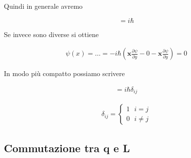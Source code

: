 Quindi in generale avremo

\begin{equation}
[\mathbf{q_i}, \mathbf{p_i}]= i \hbar
\end{equation}

Se invece sono diverse si ottiene

\begin{align}
[\mathbf{x}, \mathbf{p_y}]\psi(x)= \dots =  -i \hbar \left(
\mathbf{x} \frac{\partial \psi}{\partial y} - 0 - \mathbf{x} \frac{\partial \psi}{\partial y}
\right)= 0
\end{align}

In modo più compatto possiamo scrivere

\begin{align}
[\mathbf{q_i}, \mathbf{p_i}]= i \hbar \delta_{ij}
\end{align}

\begin{align}
 \delta_{ij} =
\left\{\begin{array}{ccc}
1 \:\:\: i=j\\
0 \:\:\: i \neq j
\end{array}\right. 
\end{align}


\subsection{Commutazione tra q e L}

